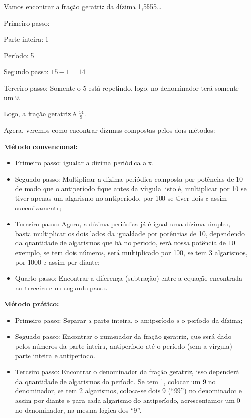 Vamos encontrar a fração geratriz da dízima 1,5555\ldots{}

Primeiro passo:

Parte inteira: 1

Período: 5

Segundo passo: \(15 - 1 = 14\)

Terceiro passo: Somente o 5 está repetindo, logo, no denominador terá
somente um 9.

Logo, a fração geratriz é \(\frac{14}{9}\).

Agora, veremos como encontrar dízimas compostas pelos dois métodos:

\textbf{Método convencional:}

\begin{itemize}
\item
  Primeiro passo: igualar a dízima periódica a x.
\item
  Segundo passo: Multiplicar a dízima periódica composta por potências
  de 10 de modo que o antiperíodo fique antes da vírgula, isto é,
  multiplicar por 10 se tiver apenas um algarismo no antiperíodo, por
  100 se tiver dois e assim sucessivamente;
\item
  Terceiro passo: Agora, a dízima periódica já é igual uma dízima
  simples, basta multiplicar os dois lados da igualdade por potências de
  10, dependendo da quantidade de algarismos que há no período, será
  nossa potência de 10, exemplo, se tem dois números, será multiplicado
  por 100, se tem 3 algarismos, por 1000 e assim por diante;
\item
  Quarto passo: Encontrar a diferença (subtração) entre a equação
  encontrada no terceiro e no segundo passo.
\end{itemize}

\textbf{Método prático:}

\begin{itemize}
\item
  Primeiro passo: Separar a parte inteira, o antiperíodo e o período da
  dízima;
\item
  Segundo passo: Encontrar o numerador da fração geratriz, que será dado
  pelos números da parte inteira, antiperíodo até o período (sem a
  vírgula) - parte inteira e antiperíodo.
\item
  Terceiro passo: Encontrar o denominador da fração geratriz, isso
  dependerá da quantidade de algarismos do período. Se tem 1, colocar um
  9 no denominador, se tem 2 algarismos, coloca-se dois 9 (``99'') no
  denominador e assim por diante e para cada algarismo do antiperíodo,
  acrescentamos um 0 no denominador, na mesma lógica dos ``9''.
\end{itemize}

